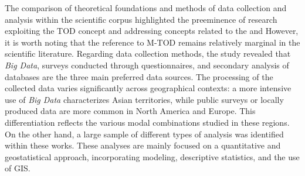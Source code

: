 \begin{refsegment}
The comparison of theoretical foundations and methods of data collection and analysis within the scientific corpus highlighted the preeminence of research exploiting the \acrshort{TOD} concept and addressing concepts related to the  and  However, it is worth noting that the reference to \acrshort{M-TOD} remains relatively marginal in the scientific literature. Regarding data collection methods, the study revealed that \textsl{Big Data}, surveys conducted through questionnaires, and secondary analysis of databases are the three main preferred data sources. The processing of the collected data varies significantly across geographical contexts: a more intensive use of \textsl{Big Data} characterizes Asian territories, while public surveys or locally produced data are more common in North America and Europe. This differentiation reflects the various modal combinations studied in these regions. On the other hand, a large sample of different types of analysis was identified within these works. These analyses are mainly focused on a quantitative and geostatistical approach, incorporating modeling, descriptive statistics, and the use of \acrshort{GIS}.%


\end{refsegment}
